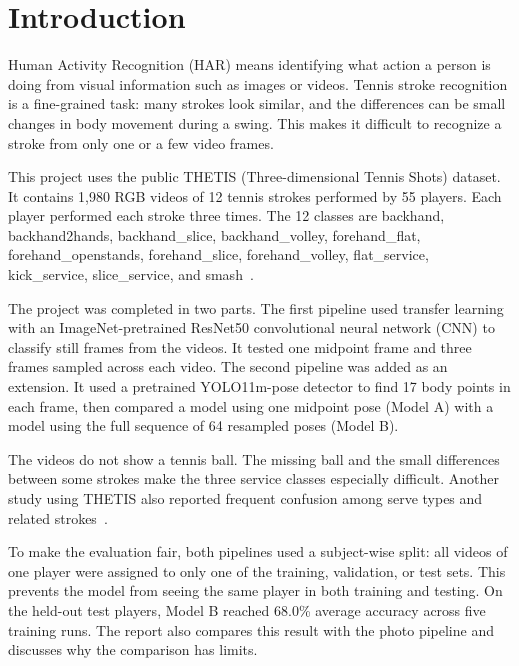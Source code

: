 \documentclass[12pt,a4paper]{article}
\begin{document}
\newpage
{}
\tableofcontents
\newpage
\listoffigures
\newpage
\listoftables
\newpage
{}

\section{Introduction}
Human Activity Recognition (HAR) means identifying what action a person is doing from visual information such as images or videos. Tennis stroke recognition is a fine-grained task: many strokes look similar, and the differences can be small changes in body movement during a swing. This makes it difficult to recognize a stroke from only one or a few video frames.

This project uses the public THETIS (Three-dimensional Tennis Shots) dataset. It contains 1,980 RGB videos of 12 tennis strokes performed by 55 players. Each player performed each stroke three times. The 12 classes are backhand, backhand2hands, backhand\_slice, backhand\_volley, forehand\_flat, forehand\_openstands, forehand\_slice, forehand\_volley, flat\_service, kick\_service, slice\_service, and smash~\cite{gourgari2013thetis}.

The project was completed in two parts. The first pipeline used transfer learning with an ImageNet-pretrained ResNet50 convolutional neural network (CNN) to classify still frames from the videos. It tested one midpoint frame and three frames sampled across each video. The second pipeline was added as an extension. It used a pretrained YOLO11m-pose detector to find 17 body points in each frame, then compared a model using one midpoint pose (Model A) with a model using the full sequence of 64 resampled poses (Model B).

The videos do not show a tennis ball. The missing ball and the small differences between some strokes make the three service classes especially difficult. Another study using THETIS also reported frequent confusion among serve types and related strokes~\cite{hovad2024classification}.

To make the evaluation fair, both pipelines used a subject-wise split: all videos of one player were assigned to only one of the training, validation, or test sets. This prevents the model from seeing the same player in both training and testing. On the held-out test players, Model B reached 68.0\% average accuracy across five training runs. The report also compares this result with the photo pipeline and discusses why the comparison has limits.
\end{document}
